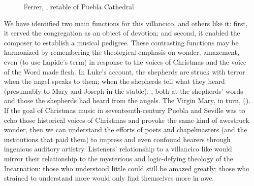 \begin{figure}
    \caption{Ferrer, , retable of Puebla
    Cathedral}

    \label{fig:Puebla-Ferrer-Pastores}

\end{figure}

We have identified two main functions for this villancico, and others like it:
first, it served the congregation as an object of devotion; and second, it
enabled the composer to establish a musical pedigree.
These contrasting functions may be harmonized by remembering the theological
emphasis on wonder, amazement, even  (to use Lapide's term)
in response to the voices of Christmas and the voice of the Word made flesh.
In Luke's account, the shepherds are struck with terror when the angel speaks to
them; when the shepherds tell what they heard (presumably to Mary and Joseph in
the stable), , both at the shepherds' words
and those the shepherds had heard from the angels.
The Virgin Mary, in turn,  ().
If the goal of Christmas music in seventeenth-century Puebla and Seville was to
echo those historical voices of Christmas and provoke the same kind of awestruck
wonder, then we can understand the efforts of poets and chapelmasters (and the
institutions that paid them) to impress and even confound hearers through
ingenious auditory artistry.
Listeners' relationship to a villancico like 
would mirror their relationship to the mysterious and logic-defying theology of
the Incarnation: those who understood little could still be amazed greatly;
those who strained to understand more would only find themselves more in awe.

\endinput
